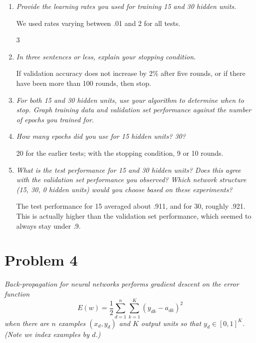 \documentclass{article}
\newcommand{\edit}[1]{\colorbox{Yellow}{#1}}
\begin{document}
\begin{enumerate}
\begin{enumerate}
    \item \textit{Provide the learning rates you used for training 15
      and 30 hidden units.}
      
      We used rates varying between .01 and 2 for all tests.


      \setcounter{enumii}3

    \item \textit{In three sentences or less, explain your stopping
      condition.}

      If validation accuracy does not increase by 2\% after five rounds,
      or if there have been more than 100 rounds, then stop. 
      
    \item \textit{For both 15 and 30 hidden units, use your algorithm
      to determine when to stop. Graph training data and validation
      set performance against the number of epochs you trained for.}


    \item \textit{How many epochs did you use for 15 hidden units?
      30?}

      20 for the earlier tests; with the stopping condition, 9 or 10
      rounds.

    \item \textit{What is the test performance for 15 and 30 hidden
      units? Does this agree with the validation set performance you
      observed? Which network structure (15, 30, 0 hidden units) would
      you choose based on these experiments?}

      The test performance for 15 averaged about .911, and for 30,
      roughly .921.  This is actually higher than the validation set
      performance, which seemed to always stay under .9.
    \end{enumerate}


  \end{enumerate}

  \section*{Problem 4}
  \textit{Back-propagation for neural networks performs gradient
    descent on the error function}
  \[E(w)=\frac{1}{2}\sum_{d=1}^n\sum_{k=1}^K(y_{dk}-a_{dk})^2\]
  \textit{when there are $n$ examples $(x_d,y_d)$ and $K$ output units
    so that $y_d\in [0,1]^K$. (Note we index examples by $d$.)}
\end{document}

